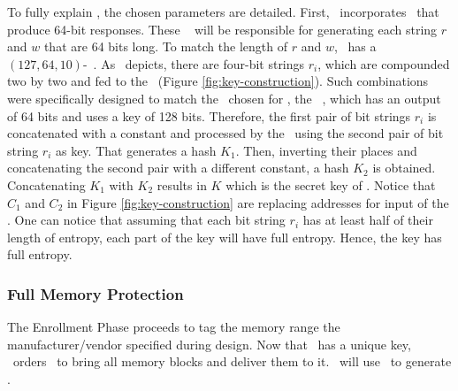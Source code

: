 To fully explain \fenroll, the chosen parameters are detailed. First, \cshia~incorporates \pufs~that produce 64-bit responses. These \pufs~ will be responsible for generating each string $r$ and $w$ that are 64 bits long. To match the length of $r$ and $w$, \cshia~has a $(127, 64, 10)$-\bch~\ecc. As \fenroll~depicts, there are four-bit strings $r_i$, which are compounded two by two and fed to the \prf~(Figure \ref{fig:key-construction}). Such combinations were specifically designed to match the \prf~chosen for \cshia, the \siphash~\cite{Aumasson2012:SipHash}, which has an output of 64 bits and uses a key of 128 bits. Therefore, the first pair of bit strings $r_i$ is concatenated with a constant and processed by the \prf~using the second pair of bit string $r_i$ as key. That generates a hash $K_1$. Then, inverting their places and concatenating the second pair with a different constant, a hash $K_2$ is obtained. Concatenating $K_1$ with $K_2$ results in $K$ which is the secret key of \cshia. Notice that $C_1$ and $C_2$ in Figure \ref{fig:key-construction} are replacing addresses for input of the \ptaggen. One can notice that assuming that each bit string $r_i$ has at least half of their length of entropy, each part of the key will have full entropy. Hence, the key has full entropy. 

\subsubsection{Full Memory Protection}
\label{subsubsec:Full-Memory-Protection}

The Enrollment Phase proceeds to tag the memory range the manufacturer\slash{}vendor specified during design. Now that \ptaggen~has a unique key, \seceng~orders \handler~to bring all memory blocks and deliver them to it. \seceng~will use \ptaggen~to generate \ptags.%



